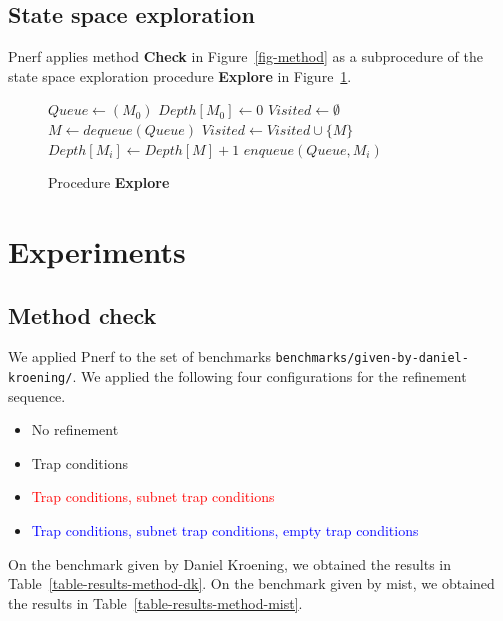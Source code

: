 \documentclass{article}
\begin{document}
\subsection{State space exploration}

Pnerf applies method {\bf Check} in Figure~\ref{fig-method} as a subprocedure of
the state space exploration procedure {\bf Explore} in
Figure~\ref{fig-procedure-explore}.

\begin{figure}[h]
\begin{algorithmic}[1]
  \State $Queue \gets ( M_0 )$
  \State $Depth[M_0] \gets 0$
  \State $Visited \gets \emptyset$
    \State $M \gets dequeue(Queue)$
    \State $Visited \gets Visited \cup \{ M \}$
      \State \Return {}
    \EndIf
      \State \Return {}
    \EndIf
          \State $Depth[M_i] \gets Depth[M] + 1$
          \State $enqueue(Queue, M_i)$
        \EndIf
      \EndFor
    \EndIf
  \EndWhile
  \State \Return {}
\EndProcedure
\end{algorithmic}
\caption{Procedure {\bf Explore}}
\label{fig-procedure-explore}
\end{figure}


\section{Experiments}

\subsection{Method check}

We applied Pnerf to the set of benchmarks
\verb?benchmarks/given-by-daniel-kroening/?. We applied the following
four configurations for the refinement sequence.
\begin{itemize}
  \item No refinement
  \item \textcolor{OliveGreen}{Trap conditions}
  \item \textcolor{red}{Trap conditions, subnet trap conditions}
  \item \textcolor{blue}{Trap conditions, subnet trap conditions, empty trap conditions}
\end{itemize}
On the benchmark given by Daniel Kroening, we obtained the results in Table~\ref{table-results-method-dk}.
On the benchmark given by mist, we obtained the results in Table~\ref{table-results-method-mist}.
\end{document}
